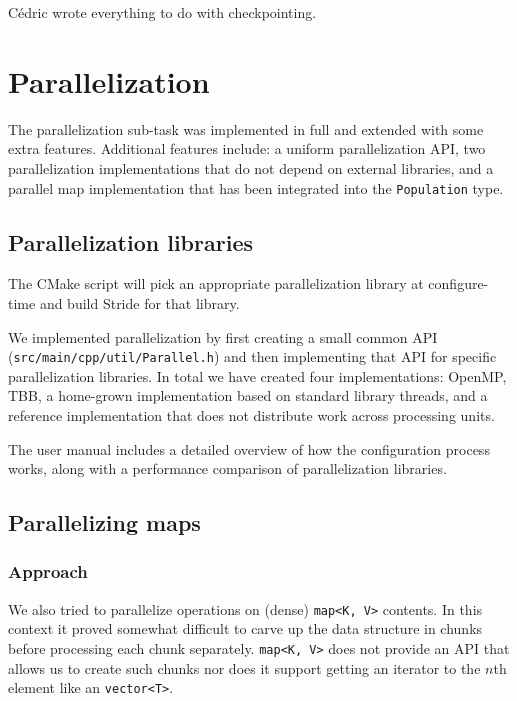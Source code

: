 \documentclass[a4paper,12pt]{article}
\newcommand{\sourcefile}[1]{\texttt{src/main/cpp/#1}}
\newcommand{\typename}[2]{\texttt{#2}} %
\begin{document}
C\'edric wrote everything to do with checkpointing.

\section{Parallelization}

The parallelization sub-task was implemented in full and extended with some extra features. Additional features include: a uniform parallelization API, two parallelization implementations that do not depend on external libraries, and a parallel map implementation that has been integrated into the \typename{stride}{Population} type.

\subsection{Parallelization libraries}

The CMake script will pick an appropriate parallelization library at configure-time and build Stride for that library.

We implemented parallelization by first creating a small common API (\sourcefile{util/Parallel.h}) and then implementing that API for specific parallelization libraries. In total we have created four implementations: OpenMP, TBB, a home-grown implementation based on standard library threads, and a reference implementation that does not distribute work across processing units.

The user manual includes a detailed overview of how the configuration process works, along with a performance comparison of parallelization libraries.

\subsection{Parallelizing maps}

\subsubsection{Approach}

We also tried to parallelize operations on (dense) \typename{std}{map<K, V>} contents. In this context it proved somewhat difficult to carve up the data structure in chunks before processing each chunk separately. \typename{std}{map<K, V>} does not provide an API that allows us to create such chunks nor does it support getting an iterator to the $n$th element like an \typename{std}{vector<T>}.
\end{document}
